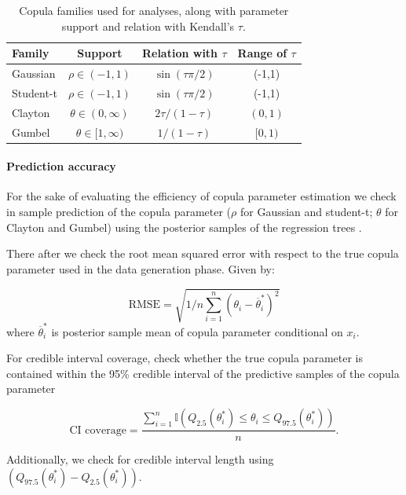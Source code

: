\documentclass{amsart}
\begin{document}
\begin{table}
    \centering
    \begin{tabular}{l|c|c|c}
    \toprule
        Family & Support & Relation with $\tau$ & Range of $\tau$ \\
         \midrule
        Gaussian & $\rho \in (-1,1)$ & $\sin(\tau\pi/2)$ & (-1,1)\\
        Student-t & $\rho \in (-1,1)$ & $\sin(\tau\pi/2)$ & (-1,1) \\
        Clayton & $\theta \in (0,\infty)$ & $2\tau/(1-\tau)$ & $(0,1)$ \\
        Gumbel & $\theta\in [1,\infty)$ & $1/(1-\tau)$  & $[0,1)$ \\
        \bottomrule
    \end{tabular}
    \caption{Copula families used for analyses, along with parameter support and relation with Kendall's $\tau$.}
    \label{tab:cop:link}
\end{table}

\paragraph{Prediction accuracy} For the sake of evaluating the efficiency of copula parameter estimation we check in sample prediction of the copula parameter ($\rho$ for Gaussian and student-t; $\theta$ for Clayton and Gumbel) using the posterior samples of the regression trees . 

There after we check the root mean squared error with respect to the true copula parameter used in the data generation phase. Given by:

\begin{equation}
    \text{RMSE} = \sqrt{1/n\sum_{i=1}^n (\theta_i - \overline{\theta}^*_i)^2}
\end{equation}
where $\overline{\theta}^*_i$ is posterior sample mean of copula parameter conditional on $x_i$.

For credible interval coverage, check whether the true copula parameter is contained within the 95\% credible interval of the predictive samples of the copula parameter

\begin{equation}
    \text{CI coverage} = \frac{\sum_{i=1}^n\mathbb{I}\left(Q_{2.5}(\theta^*_i) \le \theta_i \le Q_{97.5}(\theta^*_i)\right)}{n}.
\end{equation}

Additionally, we check for credible interval length using $\left(Q_{97.5}(\theta^*_i) - Q_{2.5}(\theta^*_i)\right)$.
\end{document}
